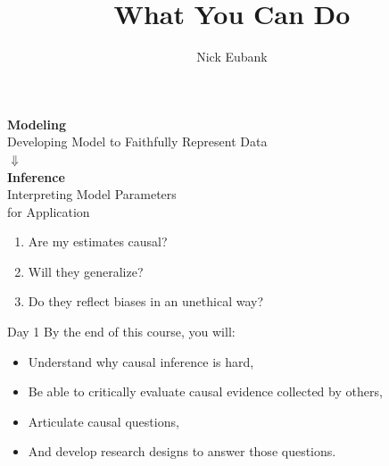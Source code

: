 \documentclass[11pt]{beamer}
\title{What You Can Do}
\author{\small Nick Eubank}
\date{\vspace*{.3in} \date}
\begin{document}
\begin{frame}[c]
\maketitle
\end{frame}


\begin{frame}[c]
    \centering
    \textbf{Modeling} \\
    Developing Model to Faithfully Represent Data \\
    \vspace*{0.2cm}
    \pause $\Downarrow$ \\
    \vspace*{0.2cm}
     \textbf{Inference} \\
    Interpreting Model Parameters \\
    for Application \\
    \vspace{1cm}
    \begin{enumerate}
        \pause \item Are my estimates causal?
        \pause \item Will they generalize?
        \pause \item Do they reflect biases in an unethical way?
    \end{enumerate}
  \end{frame}


\begin{frame}[c]{Day 1}
\pause By the end of this course, you will:
    \begin{itemize}
        \item Understand why causal inference is hard, \\
        \item Be able to critically evaluate causal evidence collected by others, \\
        \item Articulate causal questions, \\
        \item And develop research designs to answer those questions. \\
    \end{itemize}
    \end{frame}
\end{document}
